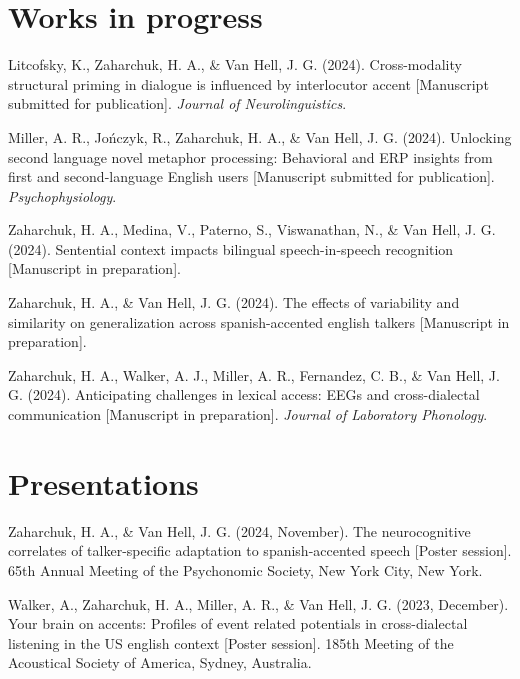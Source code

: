 \documentclass[11pt,a4paper,]{awesome-cv}
\begin{document}
\hypertarget{works-in-progress}{%
\section{Works in progress}\label{works-in-progress}}

\hypertarget{bibliography}{}
\leavevmode{}%
Litcofsky, K., Zaharchuk, H. A., \& Van Hell, J. G. (2024).
Cross-modality structural priming in dialogue is influenced by
interlocutor accent {[}Manuscript submitted for publication{]}.
\emph{Journal of Neurolinguistics}.

\leavevmode{}%
Miller, A. R., Jończyk, R., Zaharchuk, H. A., \& Van Hell, J. G. (2024).
Unlocking second language novel metaphor processing: Behavioral and ERP
insights from first and second-language English users {[}Manuscript
submitted for publication{]}. \emph{Psychophysiology}.

\leavevmode{}%
Zaharchuk, H. A., Medina, V., Paterno, S., Viswanathan, N., \& Van Hell,
J. G. (2024). Sentential context impacts bilingual speech-in-speech
recognition {[}Manuscript in preparation{]}.

\leavevmode{}%
Zaharchuk, H. A., \& Van Hell, J. G. (2024). The effects of variability
and similarity on generalization across spanish-accented english talkers
{[}Manuscript in preparation{]}.

\leavevmode{}%
Zaharchuk, H. A., Walker, A. J., Miller, A. R., Fernandez, C. B., \& Van
Hell, J. G. (2024). Anticipating challenges in lexical access: EEGs and
cross-dialectal communication {[}Manuscript in preparation{]}.
\emph{Journal of Laboratory Phonology}.

\hypertarget{presentations}{%
\section{Presentations}\label{presentations}}

\hypertarget{bibliography}{}
\leavevmode{}%
Zaharchuk, H. A., \& Van Hell, J. G. (2024, November). The
neurocognitive correlates of talker-specific adaptation to
spanish-accented speech {[}Poster session{]}. 65th Annual Meeting of the
Psychonomic Society, New York City, New York.

\leavevmode{}%
Walker, A., Zaharchuk, H. A., Miller, A. R., \& Van Hell, J. G. (2023,
December). Your brain on accents: Profiles of event related potentials
in cross-dialectal listening in the US english context {[}Poster
session{]}. 185th Meeting of the Acoustical Society of America, Sydney,
Australia.
\end{document}
